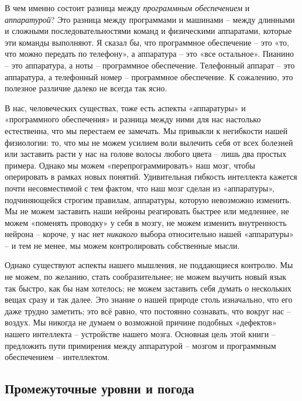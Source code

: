 \documentclass[../main.tex]{subfiles}
\begin{document}
В чем именно состоит разница между \emph{программным обеспечением} и \emph{аппаратурой}? Это разница между программами и машинами \--- между длинными и сложными последовательностями команд и физическими аппаратами, которые эти команды выполняют. Я сказал бы, что программное обеспечение \--- это «то, что можно передать по телефону», а аппаратура \--- это «все остальное». Пианино \--- это аппаратура, а ноты \--- программное обеспечение. Телефонный аппарат \--- это аппаратура, а телефонный номер \--- программное обеспечение. К сожалению, это полезное различие далеко не всегда так ясно.

В нас, человеческих существах, тоже есть аспекты «аппаратуры» и «программного обеспечения» и разница между ними для нас настолько естественна, что мы перестаем ее замечать. Мы привыкли к негибкости нашей физиологии: то, что мы не можем усилием воли вылечить себя от всех болезней или заставить расти у нас на голове волосы любого цвета \--- лишь два простых примера. Однако мы можем «перепрограммировать» наш мозг, чтобы оперировать в рамках новых понятий. Удивительная гибкость интеллекта кажется почти несовместимой с тем фактом, что наш мозг сделан из «аппаратуры», подчиняющейся строгим правилам, аппаратуры, которую невозможно изменить. Мы не можем заставить наши нейроны реагировать быстрее или медленнее, не можем «поменять проводку» у себя в мозгу, не можем изменить внутренность нейрона \--- короче, у нас нет \emph{никакого} выбора относительно нашей «аппаратуры» \--- и тем не менее, мы можем контролировать собственные мысли.

Однако существуют аспекты нашего мышления, не поддающиеся контролю. Мы не можем, по желанию, стать сообразительнее; не можем выучить новый язык так быстро, как бы нам хотелось; не можем заставить себя думать о нескольких вещах сразу и так далее. Это знание о нашей природе столь изначально, что его даже трудно заметить; это всё равно, что постоянно сознавать, что вокруг нас \--- воздух. Мы никогда не думаем о возможной причине подобных «дефектов» нашего интеллекта \--- устройстве нашего мозга. Основная цель этой книги \--- предложить пути примирения между аппаратурой \--- мозгом и программным обеспечением \--- интеллектом.


\subsection{Промежуточные уровни и погода}
\end{document}
